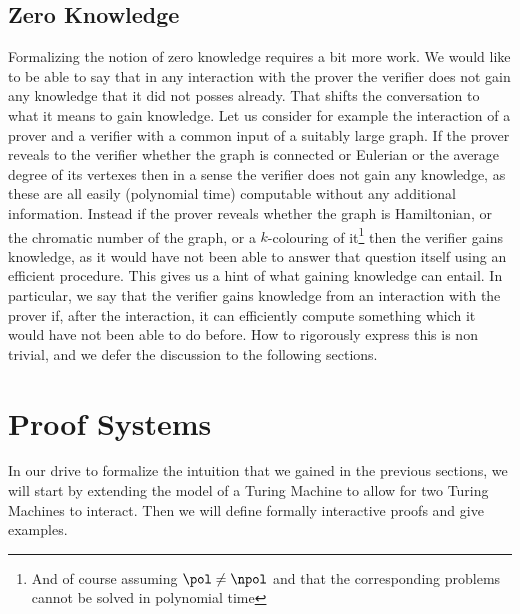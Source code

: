 \documentclass{article}
\begin{document}
\subsection{Zero Knowledge}
Formalizing the notion of zero knowledge requires a bit more work. We would like to be able to say that in any interaction with the prover the verifier does not gain any knowledge that it did not posses already. That shifts the conversation to what it means to gain knowledge. Let us consider for example the interaction of a prover and a verifier with a common input of a suitably large graph. If the prover reveals to the verifier whether the graph is connected or Eulerian or the average degree of its vertexes then in a sense the verifier does not gain any knowledge, as these are all easily (polynomial time) computable without any additional information. Instead if the prover reveals whether the graph is Hamiltonian, or the chromatic number of the graph, or a $k$-colouring of it\footnote{And of course assuming $\pol \neq \npol$ and that the corresponding problems cannot be solved in polynomial time} then the verifier gains knowledge, as it would have not been able to answer that question itself using an efficient procedure. This gives us a hint of what gaining knowledge can entail. In particular, we say that the verifier gains knowledge from an interaction with the prover if, after the interaction, it can efficiently compute something which it would have not been able to do before. How to rigorously express this is non trivial, and we defer the discussion to the following sections.

\section{Proof Systems}
\label{interactiveproofs}
In our drive to formalize the intuition that we gained in the previous sections, we will start by extending the model of a Turing Machine to allow for two Turing Machines to interact. Then we will define formally interactive proofs and give examples.
\end{document}
